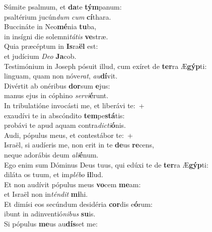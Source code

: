 \evenverse Súmite psalmum, et \textbf{da}te \textbf{tým}panum:~\*\\
\evenverse psaltérium jucún\textit{dum} \textit{cum} \textbf{cí}thara.\\
\oddverse Buccináte in Neo\textbf{mé}nia \textbf{tu}ba,~\*\\
\oddverse in insígni die solemni\textit{tá}\textit{tis} \textbf{ve}stræ.\\
\evenverse Quia præcéptum in \textbf{Is}ra\textbf{ël} est:~\*\\
\evenverse et judícium \textit{De}\textit{o} \textbf{Ja}cob.\\
\oddverse Testimónium in Joseph pósuit illud, cum exíret de \textbf{ter}ra Æ\textbf{gýp}ti:~\*\\
\oddverse linguam, quam non nóve\textit{rat}, \textit{au}\textbf{dí}vit.\\
\evenverse Divértit ab onéribus \textbf{dor}sum \textbf{e}jus:~\*\\
\evenverse manus ejus in cóphino \textit{ser}\textit{vi}\textbf{é}runt.\\
\oddverse In tribulatióne invocásti me, et liberávi te:~+\\
\oddverse  exaudívi te in abscóndito \textbf{tem}pe\textbf{stá}tis:~\*\\
\oddverse probávi te apud aquam contra\textit{di}\textit{cti}\textbf{ó}nis.\\
\evenverse Audi, pópulus meus, et contestábor te:~+\\
\evenverse  Israël, si audíeris me, non erit in te \textbf{de}us \textbf{re}cens,~\*\\
\evenverse neque adorábis deum \textit{a}\textit{li}\textbf{é}num.\\
\oddverse Ego enim sum Dóminus Deus tuus, qui edúxi te de \textbf{ter}ra Æ\textbf{gýp}ti:~\*\\
\oddverse diláta os tuum, et im\textit{plé}\textit{bo} \textbf{il}lud.\\
\evenverse Et non audívit pópulus meus \textbf{vo}cem \textbf{me}am:~\*\\
\evenverse et Israël non in\textit{tén}\textit{dit} \textbf{mi}hi.\\
\oddverse Et dimísi eos secúndum desidéria \textbf{cor}dis e\textbf{ó}rum:~\*\\
\oddverse ibunt in adinventió\textit{ni}\textit{bus} \textbf{su}is.\\
\evenverse Si pópulus \textbf{me}us au\textbf{dís}set me:~\*\\
